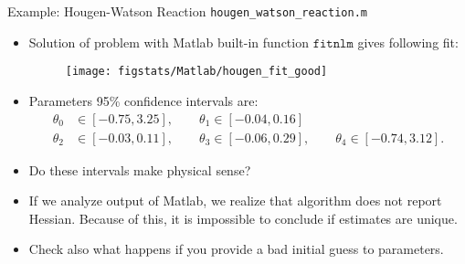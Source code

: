 \documentclass[handout,9pt]{beamer}
\begin{document}
%
\begin{frame}{Example: Hougen-Watson Reaction \footnotesize{\texttt{hougen\_watson\_reaction.m}}}

\begin{itemize}
\setlength{\itemsep}{3pt}
\item Solution of problem with Matlab built-in function $\texttt{fitnlm}$ gives following fit:
\begin{figure}[!htb]
    \centering
	\texttt{[image: figstats/Matlab/hougen\_fit\_good]}
\end{figure}
\item Parameters 95\% confidence intervals are:
\begin{align*}
\theta_0&\in [-0.75, 3.25],\qquad \theta_1\in [-0.04, 0.16]\\
\theta_2&\in [-0.03 ,0.11],\qquad \theta_3\in [-0.06, 0.29],\qquad \theta_4\in [ -0.74,3.12].
\end{align*}
\item Do these intervals make physical sense?
\pause 
\item If we analyze output of Matlab, we realize that algorithm does not report Hessian. Because of this, it is impossible to conclude if estimates are unique. 
\item Check also what happens if you provide a bad initial guess to parameters. 
\end{itemize}


\end{frame}
\end{document}
